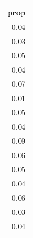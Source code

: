 \begin{tabular}{r}
  \toprule
 prop \\ 
  \midrule
  0.04 \\ 
  0.03 \\ 
  0.05 \\ 
  0.04 \\ 
  0.07 \\ 
  0.01 \\ 
  0.05 \\ 
  0.04 \\ 
  0.09 \\ 
  0.06 \\ 
  0.05 \\ 
  0.04 \\ 
  0.06 \\ 
  0.03 \\ 
  0.04 \\ 
   \bottomrule
\end{tabular}
